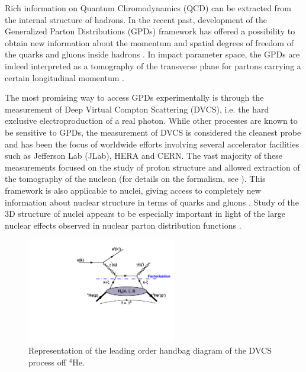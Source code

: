\documentclass[twocolumn,nofootinbib,showpacs,prl,superscriptaddress,secnumarabic,amssymb,nobibnotes,aps,floatfix]{revtex4}
\begin{document}
\maketitle 

Rich information on Quantum Chromodynamics (QCD) can be extracted from the internal structure 
of hadrons. In the recent past, development of the Generalized Parton 
Distributions (GPDs) framework has offered a possibility to obtain new 
information about the momentum and spatial degrees of freedom of the quarks and 
gluons inside hadrons 
\cite{Mueller:1998fv,Ji:1996ek,Ji:1996nm,Radyushkin:1996nd,Radyushkin:1997ki}.
In impact parameter space, the GPDs are indeed interpreted as a tomography of the 
transverse plane for partons carrying a certain longitudinal momentum 
\cite{Burkardt:2000za,Diehl:2002he,Belitsky:2002ep,Burkardt:2005hp}. 

The most promising way to access GPDs experimentally is through the measurement 
of Deep Virtual Compton Scattering (DVCS), i.e.  the hard exclusive 
electroproduction of a real photon.  While other processes are known to be 
sensitive to GPDs, the measurement of DVCS is considered the cleanest probe and 
has been the focus of worldwide efforts 
\cite{Stepanyan:2001sm,Airapetian,Chekanov:2003ya,Aktas:2005ty,Chen:2006na,Munoz 
Camacho:2006hx,Girod:2007aa,Mazouz:2007aa,Gavalian:2009,Seder:2015,Pisano:2015,Jo:2015ema} 
involving several accelerator facilities such as Jefferson Lab (JLab), HERA and  
CERN.  The vast majority of these measurements focused on the study of proton 
structure and allowed extraction of the tomography of the nucleon (for details 
on the formalism, see 
\cite{Goeke:2001tz,Diehl:2003ny,Ji:2004gf,Belitsky:2005qn,Boffi:2007yc,Guidal:2013rya}).
This framework is also applicable to nuclei, giving access to completely new 
information about nuclear structure in terms of quarks and 
gluons \cite{Dupre:2015jha}.
Study of the 3D structure of nuclei appears to be especially important
in light of the large nuclear effects observed in nuclear parton distribution 
functions \cite{Geesaman:1995yd,Norton:2003cb,Hen:2016kwk}.

\begin{figure}[tb]
\includegraphics[width=6.5cm]{figs/DVCS_diagram.pdf}
\caption{Representation of the leading order handbag diagram of the 
DVCS process off $^4$He.}
\label{fig:diags}
\end{figure}
\end{document}
